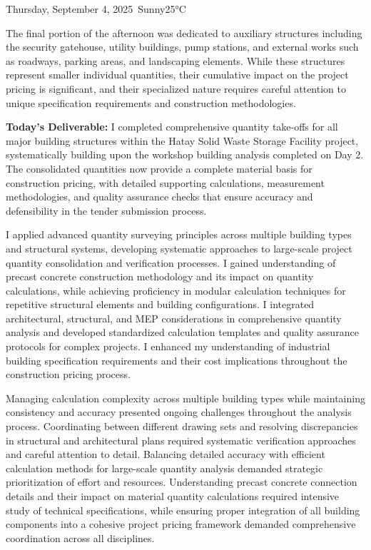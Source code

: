 \begin{dailyentry}{Thursday, September 4, 2025}{\weathersunny\ Sunny}{25°C}
\begin{workcontent}
The final portion of the afternoon was dedicated to auxiliary structures including the security gatehouse, utility buildings, pump stations, and external works such as roadways, parking areas, and landscaping elements. While these structures represent smaller individual quantities, their cumulative impact on the project pricing is significant, and their specialized nature requires careful attention to unique specification requirements and construction methodologies.

\textbf{Today's Deliverable:} I completed comprehensive quantity take-offs for all major building structures within the Hatay Solid Waste Storage Facility project, systematically building upon the workshop building analysis completed on Day 2. The consolidated quantities now provide a complete material basis for construction pricing, with detailed supporting calculations, measurement methodologies, and quality assurance checks that ensure accuracy and defensibility in the tender submission process.
\end{workcontent}

\begin{skillslearned}
\item[] I applied advanced quantity surveying principles across multiple building types and structural systems, developing systematic approaches to large-scale project quantity consolidation and verification processes. I gained understanding of precast concrete construction methodology and its impact on quantity calculations, while achieving proficiency in modular calculation techniques for repetitive structural elements and building configurations. I integrated architectural, structural, and MEP considerations in comprehensive quantity analysis and developed standardized calculation templates and quality assurance protocols for complex projects. I enhanced my understanding of industrial building specification requirements and their cost implications throughout the construction pricing process.
\end{skillslearned}

\begin{challenges}
\item[] Managing calculation complexity across multiple building types while maintaining consistency and accuracy presented ongoing challenges throughout the analysis process. Coordinating between different drawing sets and resolving discrepancies in structural and architectural plans required systematic verification approaches and careful attention to detail. Balancing detailed accuracy with efficient calculation methods for large-scale quantity analysis demanded strategic prioritization of effort and resources. Understanding precast concrete connection details and their impact on material quantity calculations required intensive study of technical specifications, while ensuring proper integration of all building components into a cohesive project pricing framework demanded comprehensive coordination across all disciplines.
\end{challenges}


\end{dailyentry}
